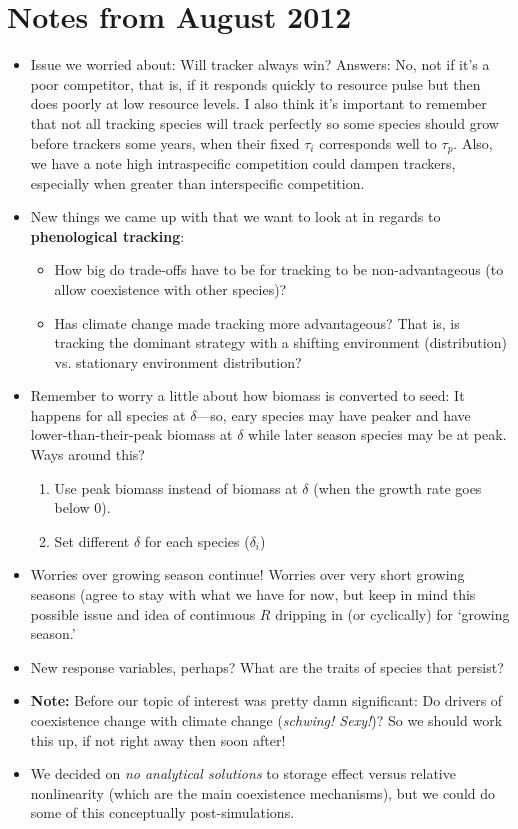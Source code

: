 \documentclass[11pt,a4paper,oneside]{article}
\begin{document}
\section{Notes from August 2012}
\begin{itemize}
\item  Issue we worried about: Will tracker always win? Answers: No, not if it's a poor competitor, that is, if it responds quickly to resource pulse but then does poorly at low resource levels. I also think it's important to remember that not all tracking species will track perfectly so some species should grow before trackers some years, when their fixed \(\tau_{i}\) corresponds well to \(\tau_{p}\). Also, we have a note high intraspecific competition could dampen trackers, especially when greater than interspecific competition.
\item New things we came up with that we want to look at in regards to {\bf phenological tracking}:
\begin{itemize}
\item How big do trade-offs have to be for tracking to be non-advantageous (to allow coexistence with other species)?
\item Has climate change made tracking more advantageous? That is, is tracking the dominant strategy with a shifting environment (distribution) vs. stationary environment distribution?
\end{itemize}
\item Remember to worry a little about how biomass is converted to seed: It happens for all species at $\delta$---so, eary species may have peaker and have lower-than-their-peak biomass at $\delta$ while later season species may be at peak. Ways around this?
\begin{enumerate}
\item Use peak biomass instead of biomass at $\delta$ (when the growth rate goes below 0). 
\item Set different $\delta$ for each species ($\delta_{i}$)
\end{enumerate}
\item Worries over growing season continue! Worries over very short growing seasons (agree to stay with what we have for now, but keep in mind this possible issue and idea of continuous $R$ dripping in (or cyclically) for `growing season.'
\item New response variables, perhaps? What are the traits of species that persist?
\item {\bf Note:} Before our topic of interest was pretty damn significant: Do drivers of coexistence change with climate change (\emph{schwing! Sexy!})? So we should work this up, if not right away then soon after!
\item We decided on \emph{no analytical solutions} to storage effect versus relative nonlinearity (which are the main coexistence mechanisms), but we could do some of this conceptually post-simulations.
\end{itemize} 
\end{document}

